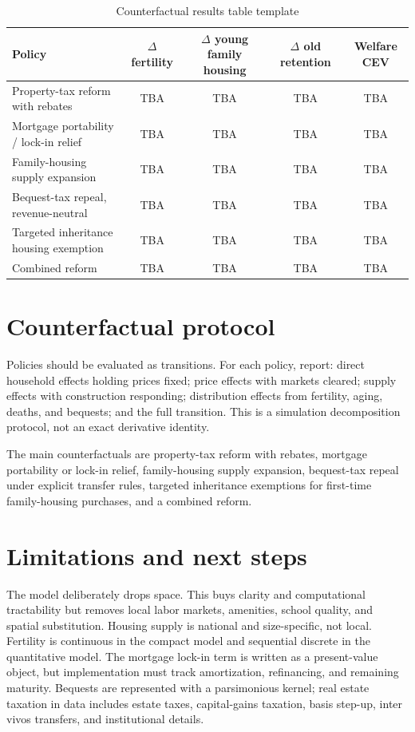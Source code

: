 \documentclass[11pt]{article}
\newcommand{\1}{\mathbf 1}
\begin{document}
\begin{table}[H]
\centering
\caption{Counterfactual results table template}
\small
\begin{tabularx}{\textwidth}{@{}X c c c c@{}}
\toprule
Policy & $\Delta$ fertility & $\Delta$ young family housing & $\Delta$ old retention & Welfare CEV \\
\midrule
Property-tax reform with rebates & TBA & TBA & TBA & TBA \\
Mortgage portability / lock-in relief & TBA & TBA & TBA & TBA \\
Family-housing supply expansion & TBA & TBA & TBA & TBA \\
Bequest-tax repeal, revenue-neutral & TBA & TBA & TBA & TBA \\
Targeted inheritance housing exemption & TBA & TBA & TBA & TBA \\
Combined reform & TBA & TBA & TBA & TBA \\
\bottomrule
\end{tabularx}
\end{table}

\section{Counterfactual protocol}

Policies should be evaluated as transitions. For each policy, report: direct household effects holding prices fixed; price effects with markets cleared; supply effects with construction responding; distribution effects from fertility, aging, deaths, and bequests; and the full transition. This is a simulation decomposition protocol, not an exact derivative identity.

The main counterfactuals are property-tax reform with rebates, mortgage portability or lock-in relief, family-housing supply expansion, bequest-tax repeal under explicit transfer rules, targeted inheritance exemptions for first-time family-housing purchases, and a combined reform.

\section{Limitations and next steps}

The model deliberately drops space. This buys clarity and computational tractability but removes local labor markets, amenities, school quality, and spatial substitution. Housing supply is national and size-specific, not local. Fertility is continuous in the compact model and sequential discrete in the quantitative model. The mortgage lock-in term is written as a present-value object, but implementation must track amortization, refinancing, and remaining maturity. Bequests are represented with a parsimonious kernel; real estate taxation in data includes estate taxes, capital-gains taxation, basis step-up, inter vivos transfers, and institutional details.
\end{document}
